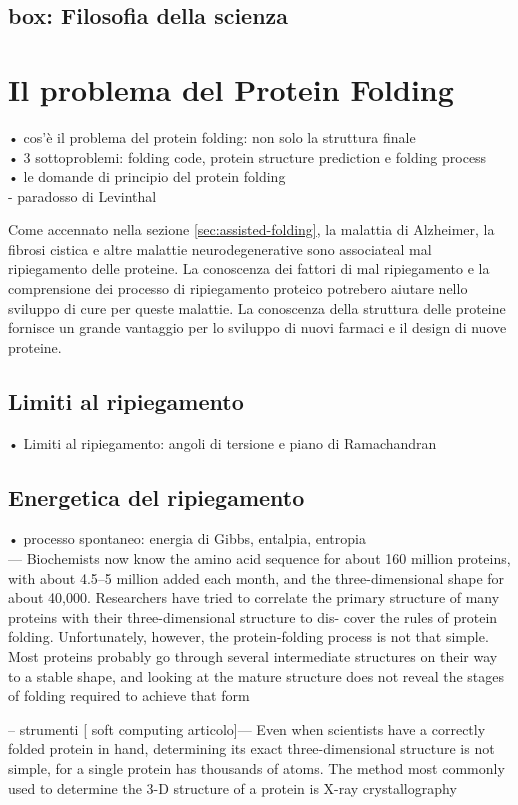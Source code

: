 \subsection{box: Filosofia della scienza}


\section{Il problema del Protein Folding}
• cos’è il problema del protein folding: non solo la struttura finale\\
• 3 sottoproblemi: folding code, protein structure prediction e folding process\\
• le domande di principio del protein folding\\
- paradosso di Levinthal

Come accennato nella sezione \ref{sec:assisted-folding}, la malattia di Alzheimer, la fibrosi cistica e altre malattie neurodegenerative sono associateal mal ripiegamento delle proteine. La conoscenza dei fattori di mal ripiegamento e la comprensione dei processo di ripiegamento proteico potrebero aiutare nello sviluppo di cure per queste malattie. La conoscenza della struttura delle proteine fornisce un grande vantaggio per lo sviluppo di nuovi farmaci e il design di nuove proteine.


\subsection{Limiti al ripiegamento}
• Limiti al ripiegamento: angoli di tersione e piano di Ramachandran\\

\subsection{Energetica del ripiegamento}
• processo spontaneo: energia di Gibbs, entalpia, entropia\\


--- Biochemists now know the amino acid sequence for about
160 million proteins, with about 4.5–5 million added each
month, and the three-dimensional shape for about 40,000.
Researchers have tried to correlate the primary structure of
many proteins with their three-dimensional structure to dis-
cover the rules of protein folding. Unfortunately, however,
the protein-folding process is not that simple. Most proteins
probably go through several intermediate structures on their
way to a stable shape, and looking at the mature structure
does not reveal the stages of folding required to achieve that
form

-- strumenti [ soft computing articolo]---
Even when scientists have a correctly folded protein in
hand, determining its exact three-dimensional structure is
not simple, for a single protein has thousands of atoms. The
method most commonly used to determine the 3-D structure
of a protein is X-ray crystallography


\clearpage